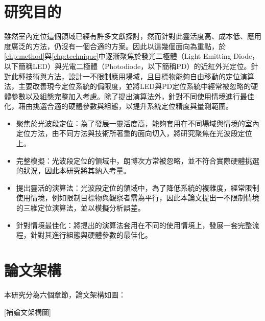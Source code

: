 




\section{研究目的}
\label{chp:purpose}
雖然室內定位這個領域已經有許多文獻探討，然而針對此靈活度高、成本低、應用度廣泛的方法，仍沒有一個合適的方案。因此以這幾個面向為重點，於\ref{chp:method}與\ref{chp:technique}中逐漸聚焦於發光二極體（Light Emitting Diode，以下簡稱LED）與光電二極體（Photodiode，以下簡稱PD）的近紅外光定位。針對此種技術與方法，設計一不限制應用場域，且目標物能夠自由移動的定位演算法，主要改善現今定位系統的侷限度，並將LED與PD定位系統中經常被忽略的硬體參數以及組態完整加入考慮。除了提出演算法外，針對不同使用情境進行最佳化，藉由挑選合適的硬體參數與組態，以提升系統定位精度與量測範圍。




\begin{itemize} 
    \item{聚焦於光波段定位}：為了發展一靈活度高，能夠套用在不同場域與情境的室內定位方法，由不同方法與技術所著重的面向切入，將研究聚焦在光波段定位上。
    \item{完整模擬}：光波段定位的領域中，朗博次方常被忽略，並不符合實際硬體挑選的狀況，因此本研究將其納入考量。
    \item{提出靈活的演算法}：光波段定位的領域中，為了降低系統的複雜度，經常限制使用情境，例如限制目標物與觀察者需為平行，因此本論文提出一不限制情境的三維定位演算法，並以模擬分析誤差。
    \item{針對情境最佳化}：將提出的演算法套用在不同的使用情境上，發展一套完整流程，針對其進行組態與硬體參數的最佳化。
\end{itemize}









\section{論文架構}
本研究分為六個章節，論文架構如圖：

[補論文架構圖]

